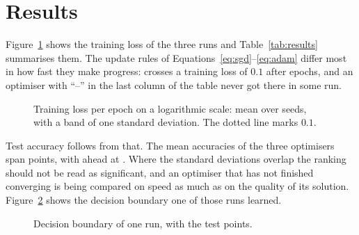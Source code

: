 \section{Results}
\label{sec:results}

Figure~\ref{fig:curves} shows the training loss of the three runs and
Table~\ref{tab:results} summarises them. The update rules of
Equations~\ref{eq:sgd}--\ref{eq:adam} differ most in how fast they make progress:
 crosses a training loss of $0.1$ after  epochs, and an
optimiser with ``--'' in the last column of the table never got there in some run.

\begin{figure}[ht]
  \centering
  \caption{Training loss per epoch on a logarithmic scale: mean over  seeds,
    with a band of one standard deviation. The dotted line marks $0.1$.}
  \label{fig:curves}
\end{figure}

\begin{table}[ht]
  \centering
  \caption{Final training loss, test accuracy, and the first epoch at which the training
    loss fell below $0.1$, as mean $\pm$ standard deviation over  seeds
    (``--'' if some run never got there).}
  \label{tab:results}
\end{table}

Test accuracy follows from that. The mean accuracies of the three optimisers span
 points, with  ahead at . Where the standard
deviations overlap the ranking should not be read as significant, and an optimiser that has
not finished converging is being compared on speed as much as on the quality of its solution.
Figure~\ref{fig:boundary} shows the decision boundary one of those runs learned.

\begin{figure}[ht]
  \centering
  \caption{Decision boundary of one  run, with the test points.}
  \label{fig:boundary}
\end{figure}

